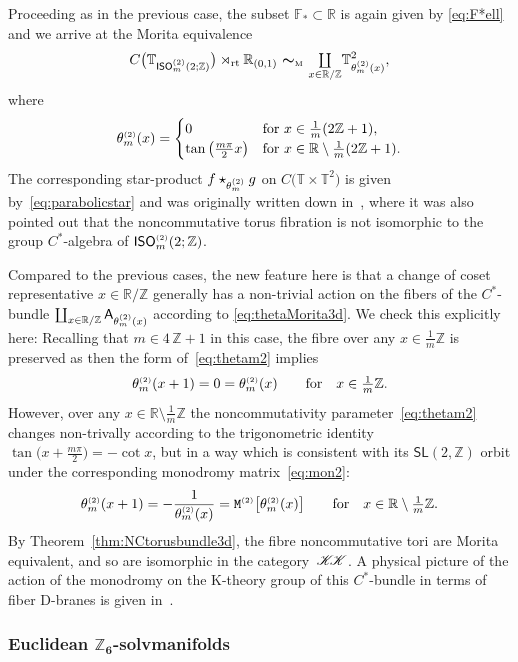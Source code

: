 \documentclass[10pt,a4paper]{amsart}
\numberwithin{equation}{section}
\newcommand{\Z}{\zed}
\newcommand{\F}{\mathbb{F}}
\newcommand{\mbf}[1]{{\boldsymbol {#1} }}
\def\A{{\sf A}}
\newcommand{\CCK}{\mathscr{K}}
\newcommand{\sfSL}{\mathsf{SL}}
\newcommand{\ISO}{{\sf ISO}}
\newcommand{\rt}{{\rm rt}}
\newcommand{\mcoprod}{\mbox{$\coprod\limits_{x\in\R/\Z}$}}
\newcommand{\R}{\real}
\newcommand{\zed}{{\mathbb Z}} %
\newcommand{\real}{{\mathbb R}} %
\newcommand{\torus}{{\mathbb T}} %
\begin{document}
Proceeding as in the previous
case, the subset $\F_*\subset\R$ is again given by \eqref{eq:F*ell} and we arrive at the Morita equivalence
\[
C\big(\torus_{\ISO^{\text{\tiny($2$)}}_m(2;\Z)}\big)\rtimes_\rt\real_{(0,1)}
\ \mbf\sim_{\text{\tiny M}} \ \mcoprod
\torus^2_{\theta^{\text{\tiny(2)}}_m(x)} ,
\]
where
\begin{gather}\label{eq:thetam2}
\theta_m^{\text{\tiny(2)}}(x) = \begin{cases}
 0 &\mbox{for} \ x \in \frac1{m} (2 \Z+1) , \\
 \tan\big(\frac{m \pi}2 x\big)
 & \mbox{for} \ x\in\R\setminus \frac1{m} (2 \Z+1) . \end{cases}
\end{gather}
The corresponding star-product
$f\star_{\theta_m^{\text{\tiny(2)}}}g$ on $C\big(\torus\times\torus^2\big)$
is given by~\eqref{eq:parabolicstar} and was originally written down
in~\cite{Hull2019}, where it was also pointed out that the
noncommutative torus fibration is not isomorphic to the group
$C^*$-algebra of $\ISO_m^{\text{\tiny(2)}}(2;\Z)$.

Compared to the previous cases, the new feature here is that a change of coset
representative $x\in\R/\Z$ generally has a
non-trivial action on the fibers of the $C^*$-bundle $\coprod_{x\in\R/\Z}
\A_{\theta_m^{\text{\tiny(2)}}(x)}$ according to
\eqref{eq:thetaMorita3d}. We check this explicitly here: Recalling that $m\in 4\,\Z+1$ in
 this case, the fibre over any $x\in\frac1m \Z$ is preserved
 as then the form of~\eqref{eq:thetam2} implies
\[
\theta_m^{\text{\tiny(2)}}(x+1) =
 0=\theta_m^{\text{\tiny(2)}}(x)
\qquad \mbox{for} \quad x\in\tfrac1m \Z .
\]
However,
 over any $x\in\R\setminus\frac1m \Z$ the noncommutativity parameter~\eqref{eq:thetam2} changes non-trivally according to the
 trigonometric identity $\tan\big(x+\frac{m \pi}2\big)=-\cot x$, but in a way which is
 consistent with its $\sfSL(2,\Z)$ orbit under the corresponding
 monodromy matrix~\eqref{eq:mon2}:
\[
\theta_m^{\text{\tiny(2)}}(x+1) = -\frac1{\theta_m^{\text{\tiny(2)}}(x)} =
{\tt M}^{\text{\tiny(2)}}\big[\theta_m^{\text{\tiny(2)}}(x)\big]
\qquad \mbox{for} \quad x\in\R\setminus\tfrac1m \Z .
\]
By Theorem~\ref{thm:NCtorusbundle3d}, the fibre noncommutative tori are Morita
equivalent, and so are isomorphic in the
category~${\CCK\hspace{-1mm}\CCK}$. A physical picture of the action
of the monodromy on the K-theory group of this $C^*$-bundle in terms
of fiber D-branes is given in~\cite{Hull2019}.

\subsubsection*{Euclidean $\boldsymbol{\Z_6}$-solvmanifolds}
\end{document}
